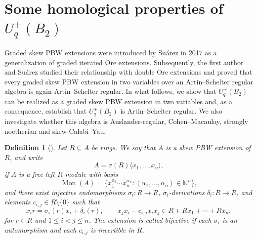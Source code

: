 \documentclass[11pt]{article}
\newtheorem{definition}[theorem]{Definition}
\theoremstyle{definition}
\begin{document}
\section{Some homological properties of
\texorpdfstring{$U_q^{+}(B_2)$}{Uq+(B2)}}
Graded skew PBW extensions were introduced by Suárez
\cite{Suarez2017KoszulityGradedSkewPBW} in 2017 as a generalization of
graded iterated Ore extensions. Subsequently, the first author and Suárez
\cite{GomezSuarez2020} studied their relationship with double Ore
extensions and proved that every graded skew PBW extension in two
variables over an Artin--Schelter regular algebra is again
Artin--Schelter regular. In what follows, we show that
\(U_q^{+}(B_2)\) can be realized as a graded skew PBW extension in two
variables and, as a consequence, establish that \(U_q^{+}(B_2)\) is
Artin--Schelter regular. We also investigate whether this algebra is Auslander-regular, 
Cohen--Macaulay, strongly noetherian and skew Calabi--Yau.
\begin{definition}[{\cite[Definition~1]{GallegoLezama}}]
Let \(R\subseteq A\) be rings. We say that \(A\) is a
\emph{skew PBW extension} of \(R\), and write
$$
A=\sigma(R)\langle x_1,\ldots,x_n\rangle,
$$
if \(A\) is a free left \(R\)-module with basis
$$
\operatorname{Mon}(A)=
\{x_1^{\alpha_1}\cdots x_n^{\alpha_n}:
(\alpha_1,\ldots,\alpha_n)\in\mathbb N^n\},
$$
and there exist injective endomorphisms \(\sigma_i:R\to R\),
\(\sigma_i\)-derivations \(\delta_i:R\to R\), and elements
\(c_{i,j}\in R\setminus\{0\}\) such that
$$
x_ir=\sigma_i(r)x_i+\delta_i(r),\qquad
x_jx_i-c_{i,j}x_ix_j\in R+Rx_1+\cdots+Rx_n,
$$
for \(r\in R\) and \(1\leq i<j\leq n\).
The extension is called \emph{bijective} if each \(\sigma_i\) is an
automorphism and each \(c_{i,j}\) is invertible in \(R\).
\end{definition}
\end{document}
